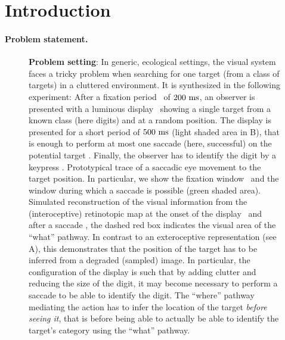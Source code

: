 \section{Introduction}
\label{sec:intro}
\paragraph{Problem statement.}
\begin{figure}[b!]%
	\caption{%
		{\bf Problem setting}: In generic, ecological settings, the visual system faces a tricky problem when searching for one target (from a class of targets) in a cluttered environment. It is synthesized in the following experiment: %
		\A After a fixation period \FIX\ of $200~\si{\milli\second}$, an observer is presented with a luminous display \DIS\ showing a single target from a known class (here digits) and at a random position. The display is presented for a short period of $500~\si{\milli\second}$ (light shaded area in B), that is enough to perform at most one saccade (here, successful) on the potential target \SAC . Finally, the observer has to identify the digit by a keypress \ANS . %
		\B Prototypical trace of a saccadic eye movement to the target position. In particular, we show the fixation window \FIX\ and the window during which a saccade is possible (green shaded area). %
		\C Simulated reconstruction of the visual information from the (interoceptive) retinotopic map at the onset of the display \DIS\ and after a saccade \SAC , the dashed red box indicates the visual area of the ``what'' pathway. In contrast to an exteroceptive representation (see A), this demonstrates that the position of the target has to be inferred from a degraded (sampled) image. In particular, the configuration of the display is such that by adding clutter and reducing the size of the digit, it may become necessary to perform a saccade to be able to identify the digit. The ``where'' pathway mediating the action has to infer the location of the target \emph{before seeing it}, that is before being able to actually be able to identify the target's category using the ``what'' pathway. %
		\label{fig:intro}}%
\end{figure}%
